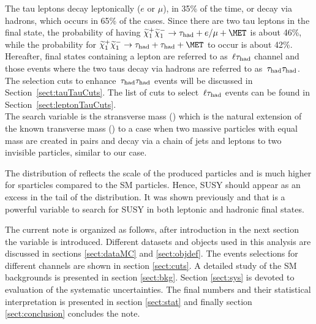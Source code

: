 The tau leptons decay leptonically ($e$ or $\mu$), in 35\% of the time, or decay via hadrons, which occurs in 65\% of the cases. Since there are two tau leptons in the final state, the probability of having $\PSGcpDo\PSGcmDo \rightarrow \hadtau+e/\mu+\MET$ is about 46\%, while the probability for $\PSGcpDo\PSGcmDo \rightarrow \hadtau+\hadtau+\MET$ to occur is about 42\%. Hereafter, final states containing a lepton are referred to as $\,\ell\tau_{\rm had}$ channel and those events where the two taus decay via hadrons are referred to as $\,\tau_{\rm had}\tau_{\rm had}$. The selection cuts to enhance $\,\tau_{\rm had}\tau_{\rm had}$ events will be discussed in Section~\ref{sect:tauTauCuts}. The list of cuts to select $\,\ell\tau_{\rm had}$ events can be found in Section~\ref{sect:leptonTauCuts}.\\     

The search variable is the stransverse mass (\mttwo) which is the natural extension of the known transverse mass (\mt) to a case 
when two massive particles with equal mass are created in pairs and decay via a chain of jets and leptons to two 
invisible particles, similar to our case.

The distribution of \mttwo reflects the scale of the produced particles and is much higher for sparticles
compared to the SM particles. Hence, SUSY should appear as an excess in the tail of the \mttwo distribution.
It was shown previously  \cite{Khachatryan:2014qwa}  and \cite{MT2_2011} that \mttwo is a powerful variable to search for SUSY in both
 leptonic and hadronic final states.

The current note is organized as follows, after introduction in the next section the \mttwo variable is introduced. Different datasets 
and objects used in this analysis are discussed in sections \ref{sect:dataMC} and \ref{sect:objdef}. The events selections for different channels
are shown in section \ref{sect:cuts}. A detailed study of the SM backgrounds is presented in section \ref{sect:bkg}. Section \ref{sect:sys} 
is devoted to evaluation of the systematic uncertainties. The final numbers and their statistical interpretation is presented in 
section \ref{sect:stat} and finally section \ref{sect:conclusion} concludes the note.





